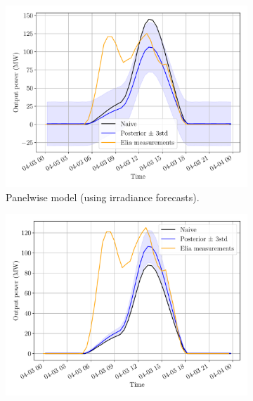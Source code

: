\documentclass[a4paper, 12pt]{article}
\begin{document}
\begin{figure}[H]
	\centering
	\begin{subfigure}{0.48\textwidth}
		\centering
		\includegraphics[width=\textwidth]{resources/pdf/solar_panelwise_meas_for (START_FOR 03-04-2020).pdf}
		\vspace{-0.5em}
		\caption{Panelwise model (using irradiance forecasts).}
	\end{subfigure}
	\hspace{0.5em}
	\begin{subfigure}{0.48\textwidth}
		\centering
		\includegraphics[width=\textwidth]{resources/pdf/solar_provincial_meas_for (START_FOR 03-04-2020).pdf}
		\vspace{-0.5em}

\end{subfigure}
\end{figure}
\end{document}
